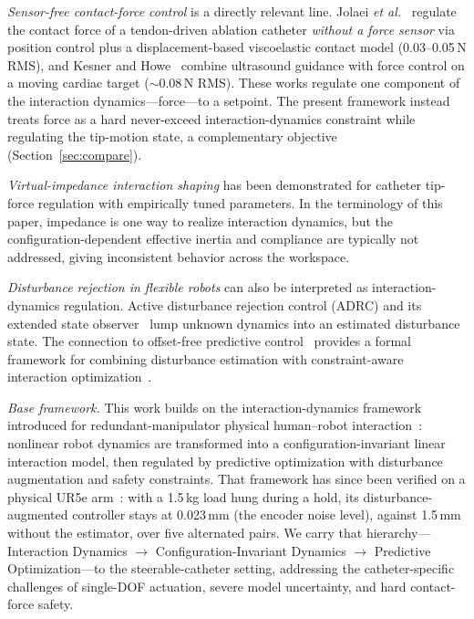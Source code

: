 \emph{Sensor-free contact-force control} is a directly relevant line. Jolaei \emph{et al.}~\cite{jolaei2020} regulate the contact force of a tendon-driven ablation catheter \emph{without a force sensor} via position control plus a displacement-based viscoelastic contact model (0.03--0.05\,N RMS), and Kesner and Howe~\cite{kesner2014} combine ultrasound guidance with force control on a moving cardiac target (${\sim}0.08$\,N RMS). These works regulate one component of the interaction dynamics---force---to a setpoint. The present framework instead treats force as a hard never-exceed interaction-dynamics constraint while regulating the tip-motion state, a complementary objective (Section~\ref{sec:compare}).

\emph{Virtual-impedance interaction shaping} has been demonstrated for catheter tip-force regulation with empirically tuned parameters. In the terminology of this paper, impedance is one way to realize interaction dynamics, but the configuration-dependent effective inertia and compliance are typically not addressed, giving inconsistent behavior across the workspace.

\emph{Disturbance rejection in flexible robots} can also be interpreted as interaction-dynamics regulation. Active disturbance rejection control (ADRC) and its extended state observer~\cite{han2009} lump unknown dynamics into an estimated disturbance state. The connection to offset-free predictive control~\cite{pannocchia2003,maeder2009} provides a formal framework for combining disturbance estimation with constraint-aware interaction optimization~\cite{rawlings2017}.

\emph{Base framework.} This work builds on the interaction-dynamics framework introduced for redundant-manipulator physical human--robot interaction~\cite{cao2026phri}: nonlinear robot dynamics are transformed into a configuration-invariant linear interaction model, then regulated by predictive optimization with disturbance augmentation and safety constraints. That framework has since been verified on a physical UR5e arm~\cite{cao2026phri}: with a 1.5\,kg load hung during a hold, its disturbance-augmented controller stays at 0.023\,mm (the encoder noise level), against 1.5\,mm without the estimator, over five alternated pairs. We carry that hierarchy---Interaction Dynamics $\rightarrow$ Configuration-Invariant Dynamics $\rightarrow$ Predictive Optimization---to the steerable-catheter setting, addressing the catheter-specific challenges of single-DOF actuation, severe model uncertainty, and hard contact-force safety.

